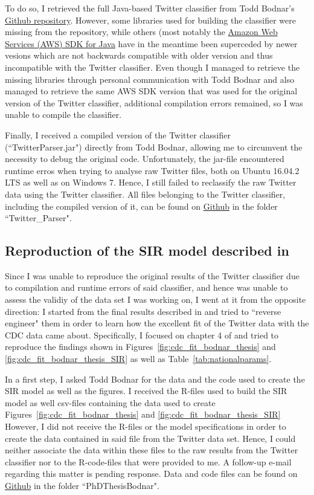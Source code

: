 \documentclass[11pt, a4paper,twoside]{report}\usepackage[]{graphicx}\usepackage[]{color}
\begin{document}
To do so, I retrieved the full Java-based Twitter classifier from Todd Bodnar's \href{https://github.com/ToddBodnar/Twitter-Parser}{Github repository}. However, some libraries used for building the classifier were missing from the repository, while others (most notably the \href{https://aws.amazon.com/de/sdk-for-java/}{Amazon Web Services (AWS) SDK for Java} have in the meantime been superceded by newer vesions which are not backwards compatible with older version and thus incompatible with the Twitter classifier. Even though I managed to retrieve the missing libraries through personal communication with Todd Bodnar and also managed to retrieve the same AWS SDK version that was used for the original version of the Twitter classifier, additional compilation errors remained, so I was unable to compile the classifier.

Finally, I received a compiled version of the Twitter classifier (``TwitterParser.jar") directly from Todd Bodnar, allowing me to circumvent the necessity to debug the original code.  Unfortunately, the jar-file encountered runtime erros when trying to analyse raw Twitter files, both on Ubuntu 16.04.2 LTS as well as on Windows 7. Hence, I still failed to reclassify the raw Twitter data using the Twitter classifier. All files belonging to the Twitter classifier, including the compiled version of it, can be found on \href{https://github.com/salathegroup/2016_TwitterEpi}{Github} in the folder ``Twitter\_Parser".

\subsection{Reproduction of the SIR model described in \cite{bodnar_data_2015}}
Since I was unable to reproduce the original results of the Twitter classifier due to compilation and runtime errors of said classifier, and hence was unable to assess the validiy of the data set I was working on, I went at it from the opposite direction: I started from the final results described in \cite{bodnar_data_2015} and tried to ``reverse engineer" them in order to learn how the excellent fit of the Twitter data with the CDC data came about. Specifically, I focused on chapter 4 of \cite{bodnar_data_2015} and tried to reproduce the findings shown in Figures~\ref{fig:cdc_fit_bodnar_thesis} and \ref{fig:cdc_fit_bodnar_thesis_SIR} as well as Table~\ref{tab:nationalparams}.

In a first step, I asked Todd Bodnar for the data and the code used to create the SIR model as well as the figures. I received the R-files used to build the SIR model as well csv-files containing the data used to create Figures~\ref{fig:cdc_fit_bodnar_thesis} and \ref{fig:cdc_fit_bodnar_thesis_SIR}  However, I did not receive the R-files or the model specifications in order to create the data contained in said file from the Twitter data set. Hence, I could neither associate the data within these files to the raw results from the Twitter classifier nor to the R-code-files that were provided to me. A follow-up e-mail regarding this matter is pending response. Data and code files can be found on \href{https://github.com/salathegroup/2016_TwitterEpi}{Github} in the folder ``PhDThesisBodnar".
\end{document}

